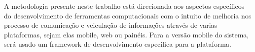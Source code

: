 A metodologia presente neste trabalho está direcionada aos aspectos específicos	do desenvolvimento de ferramentas computacionais com o intuito de melhoria nos processo de comunicação e veiculação de informações através de varias plataformas, sejam elas mobile, web ou painéis. Para a versão mobile do sistema, será usado um framework de desenvolvimento especifica para a plataforma.
	

